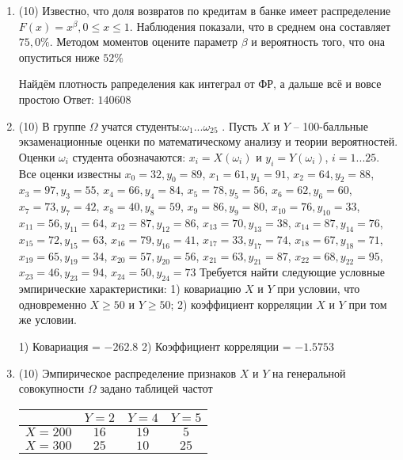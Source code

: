 \documentclass[a4paper,12pt]{article}
\begin{document}
\begin{enumerate}
\item


(10) Известно, что доля возвратов по кредитам в банке имеет распределение $F(x) = x ^{\beta}, 0 \leqslant x \leqslant 1$.
Наблюдения показали, что в среднем она составляет $75,0\%$. Методом моментов оцените параметр $\beta$ и
вероятность того, что она опуститься ниже $52\%$




Найдём плотность рапределения как интеграл от ФР, а дальше всё и вовсе простою Ответ: $140608$


\item


(10) В группе $\Omega$ учатся студенты:$\omega _{1}...\omega _{25}$ . Пусть $X$ и $Y$ – 100-балльные экзаменационные оценки по
математическому анализу и теории вероятностей. Оценки $\omega _{i}$ студента обозначаются: $x _{i} = X(\omega _{i})$ и $y _{i} = Y(\omega _{i})$, $i = 1...25$. Все оценки известны
$x _{0} = 32, y _{0} = 89$, $x _{1} = 61, y _{1} = 91$, $x _{2} = 64, y _{2} = 88$, $x _{3} = 97, y _{3} = 55$, $x _{4} = 66, y _{4} = 84$, $x _{5} = 78, y _{5} = 56$, $x _{6} = 62, y _{6} = 60$, $x _{7} = 73, y _{7} = 42$, $x _{8} = 40, y _{8} = 59$, $x _{9} = 86, y _{9} = 80$, $x _{10} = 76, y _{10} = 33$, $x _{11} = 56, y _{11} = 64$, $x _{12} = 87, y _{12} = 86$, $x _{13} = 70, y _{13} = 38$, $x _{14} = 87, y _{14} = 76$, $x _{15} = 72, y _{15} = 63$, $x _{16} = 79, y _{16} = 41$, $x _{17} = 33, y _{17} = 74$, $x _{18} = 67, y _{18} = 71$, $x _{19} = 65, y _{19} = 34$, $x _{20} = 57, y _{20} = 56$, $x _{21} = 63, y _{21} = 87$, $x _{22} = 68, y _{22} = 95$, $x _{23} = 46, y _{23} = 94$, $x _{24} = 50, y _{24} = 73$
Требуется
найти следующие условные эмпирические характеристики: 1) ковариацию $X$ и $Y$ при условии, что одновременно $X \geqslant 50$
 и $Y \geqslant 50$; 2) коэффициент корреляции $X$ и $Y$ при том же условии.




1) Ковариация = $-262.8$
2) Коэффициент корреляции = $-1.5753$


\item


(10) Эмпирическое распределение признаков $X$ и $Y$ на генеральной совокупности $\Omega$ задано таблицей частот  
 
\begin{tabular}{ | c | c | c | c | }
\hline
 & $Y = 2$ & $Y = 4$ & $Y = 5$  \\ \hline
$X = 200$ & $16$ & $19$ & $5$\\ \hline
$X = 300$ & $25$ & $10$ & $25$\\
\hline
\end{tabular}


\end{enumerate}
\end{document}
